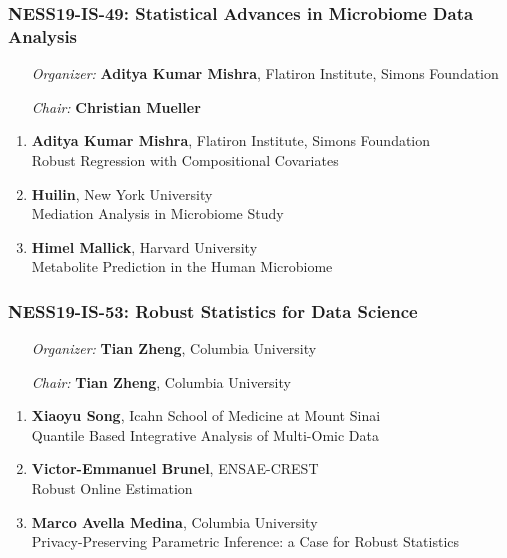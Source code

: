 \subsubsection*{NESS19-IS-49: Statistical Advances in Microbiome Data Analysis}

\begin{enumerate}[align=left]
\item [\emph{Organizer:}] \textbf{Aditya Kumar Mishra}, Flatiron Institute, Simons Foundation
\item [\emph{Chair:}] \textbf{Christian Mueller}
\end{enumerate}

\begin{enumerate}
\item \textbf{Aditya Kumar Mishra}, Flatiron Institute, Simons Foundation \\
Robust Regression with Compositional Covariates
\item \textbf{Huilin}, New York University \\
Mediation Analysis in Microbiome Study
\item \textbf{Himel Mallick}, Harvard University \\
Metabolite Prediction in the Human Microbiome
\end{enumerate}

\subsubsection*{NESS19-IS-53: Robust Statistics for Data Science}

\begin{enumerate}[align=left]
\item [\emph{Organizer:}] \textbf{Tian Zheng}, Columbia University
\item [\emph{Chair:}] \textbf{Tian Zheng}, Columbia University
\end{enumerate}

\begin{enumerate}
\item \textbf{Xiaoyu Song}, Icahn School of Medicine at Mount Sinai \\
Quantile Based Integrative Analysis of Multi-Omic Data
\item \textbf{Victor-Emmanuel Brunel}, ENSAE-CREST \\
Robust Online Estimation
\item \textbf{Marco Avella Medina}, Columbia University \\
Privacy-Preserving Parametric Inference: a Case for Robust Statistics
\end{enumerate}

